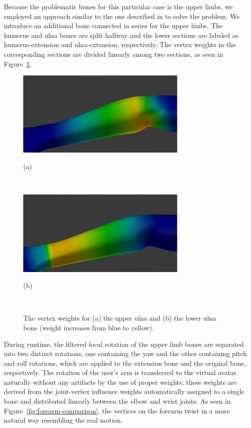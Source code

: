 \documentclass[number,preprint,review,12pt]{elsarticle}
\begin{document}
{\color{red}
Because the problematic bones for this particular case is the upper limbs, we employed an approach similar to the one described in \cite{Mohr2003} to solve the problem. We introduce an additional bone connected in series for the upper limbs. The humerus and ulna bones are split halfway and the lower sections are labeled as humerus-extension and ulna-extension, respectively. The vertex weights in the corresponding sections are divided linearly among two sections, as seen in Figure~\ref{fig:forearm-weights}. 
}

\begin{figure}[htbp]
	\centerline{\includegraphics[width=0.75\textwidth]{ulna-weight.eps}}
	\centerline{(a)}
	\centerline{\ }
	\centerline{\includegraphics[width=0.75\textwidth]{ulna-extent-weight.eps}}
	\centerline{(b)} 
	\centerline{\ } 
	\caption{The vertex weights for (a) the upper ulna and (b) the lower ulna bone (weight increases from blue to yellow).}
	\label{fig:forearm-weights}
\end{figure}

During runtime, the filtered local rotation of the upper limb bones are separated into two distinct rotations, one containing the yaw and the other containing pitch and roll rotations, which are applied to the extension bone and the original bone, respectively. {\color{red} The rotation of the user's arm is transferred to the virtual avatar naturally without any artifacts by the use of proper weights; these weights are derived from the joint-vertex influence weights automatically assigned to a single bone \cite{BlenderSuite} and distributed linearly between the elbow and wrist joints.} As seen in Figure~\ref{fig:forearm-comparison}, the vertices on the forearm twist in a more natural way resembling the real motion.
\end{document}
